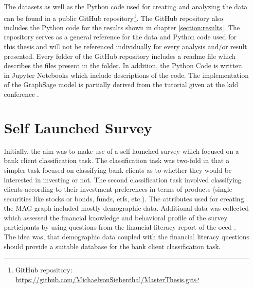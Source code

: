   \noindent The datasets as well as the Python code used for creating and 
  analyzing the data can be found in a public GitHub repository\footnote{GitHub
  repository: \url{https://github.com/MichaelvonSiebenthal/MasterThesis.git}}. 
  The GitHub repository also includes the Python code for the results shown in
  chapter \ref{section:results}. The repository serves as a general reference 
  for the data and Python code used for this thesis and will not be referenced 
  individually for every analysis and/or result presented. Every folder of the
  GitHub repository includes a readme file which describes the files present in
  the folder. In addition, the Python Code is written in Jupyter Notebooks which 
  include descriptions of the code. The implementation of the GraphSage model
  is partially derived from the tutorial given at the \acs{kdd} conference
  \citep{kdd2020}.

  \section{Self Launched Survey}
  \label{section:self_survey} 

  Initially, the aim was to make use of a self-launched survey which focused on
  a bank client classification task. The classification task was two-fold in 
  that a simpler task focused on classifying bank clients as to whether they 
  would be interested in investing or not. The second classification task
  involved classifying clients according to their investment preferences in
  terms of products (single securities like stocks or bonds, funds, \acsp{etf},
  etc.). The attributes used for creating the MAG graph included mostly 
  demographic data. Additional data was collected which assessed the financial 
  knowledge and behavioral profile of the survey participants by using questions 
  from the financial literacy report of the \acs{oecd} \citeyearpar{OECD2017}. The 
  idea was, that demographic data coupled with the financial literacy questions 
  should provide a suitable database for the bank client classification task. \\

